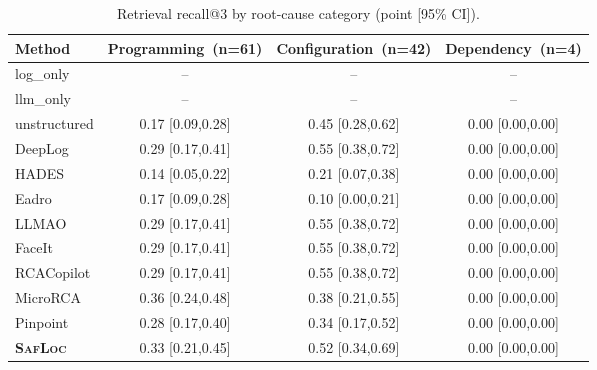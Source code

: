 \begin{table}[t]
  \centering
  \caption{Retrieval recall@3 by root-cause category (point [95\% CI]).}
  \label{tab:percat_recall}
  \setlength{\tabcolsep}{4pt}
  \footnotesize
  \begin{tabular}{lccc}
    \toprule
    Method & Programming~(n=61) & Configuration~(n=42) & Dependency~(n=4) \\
    \midrule
    log\_only & -- & -- & -- \\
    llm\_only & -- & -- & -- \\
    unstructured & 0.17 [0.09,0.28] & 0.45 [0.28,0.62] & 0.00 [0.00,0.00] \\
    DeepLog & 0.29 [0.17,0.41] & 0.55 [0.38,0.72] & 0.00 [0.00,0.00] \\
    HADES & 0.14 [0.05,0.22] & 0.21 [0.07,0.38] & 0.00 [0.00,0.00] \\
    Eadro & 0.17 [0.09,0.28] & 0.10 [0.00,0.21] & 0.00 [0.00,0.00] \\
    LLMAO & 0.29 [0.17,0.41] & 0.55 [0.38,0.72] & 0.00 [0.00,0.00] \\
    FaceIt & 0.29 [0.17,0.41] & 0.55 [0.38,0.72] & 0.00 [0.00,0.00] \\
    RCACopilot & 0.29 [0.17,0.41] & 0.55 [0.38,0.72] & 0.00 [0.00,0.00] \\
    MicroRCA & 0.36 [0.24,0.48] & 0.38 [0.21,0.55] & 0.00 [0.00,0.00] \\
    Pinpoint & 0.28 [0.17,0.40] & 0.34 [0.17,0.52] & 0.00 [0.00,0.00] \\
    \midrule
    \textbf{\textsc{SafLoc}} & 0.33 [0.21,0.45] & 0.52 [0.34,0.69] & 0.00 [0.00,0.00] \\
    \bottomrule
  \end{tabular}
\end{table}
